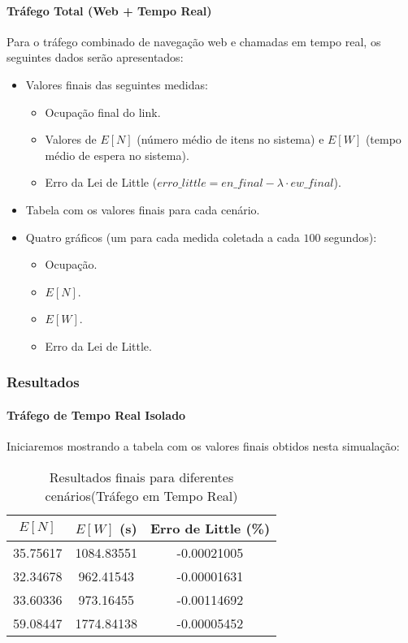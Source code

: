 \paragraph{Tráfego Total (Web + Tempo Real)}

Para o tráfego combinado de navegação web e chamadas em tempo real, os seguintes dados serão apresentados:
\begin{itemize}
    \item Valores finais das seguintes medidas:
    \begin{itemize}
        \item Ocupação final do link.
        \item Valores de \(E[N]\) (número médio de itens no sistema) e \(E[W]\) (tempo médio de espera no sistema).
        \item Erro da Lei de Little (\(erro\_little = en\_final - \lambda \cdot ew\_final\)).
    \end{itemize}
    \item Tabela com os valores finais para cada cenário.
    \item Quatro gráficos (um para cada medida coletada a cada \(100\) segundos):
    \begin{itemize}
        \item Ocupação.
        \item \(E[N]\).
        \item \(E[W]\).
        \item Erro da Lei de Little.
    \end{itemize}
\end{itemize}

\subsubsection{Resultados}
\paragraph{Tráfego de Tempo Real Isolado}
Iniciaremos mostrando a tabela com os valores finais obtidos nesta simualação:
\begin{table}[H]
    \centering
    \begin{tabular}{|c|c|c|}
        \hline
        \textbf{$E[N]$} & \textbf{$E[W]$ (s)} & \textbf{Erro de Little (\%)} \\ 
        \hline
          35.75617  & 1084.83551  & -0.00021005 \\ 
          32.34678 & 962.41543 & -0.00001631 \\ 
          33.60336 & 973.16455 & -0.00114692 \\ 
          59.08447 & 1774.84138 & -0.00005452 \\ 
        \hline
    \end{tabular}
    \caption{Resultados finais para diferentes cenários(Tráfego em Tempo Real)}
    \label{tab:resultados}
\end{table}

